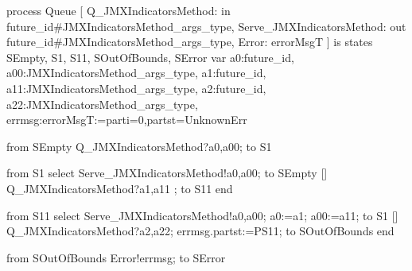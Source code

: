 process Queue [ Q_JMXIndicatorsMethod: in                            future_id#JMXIndicatorsMethod_args_type, 
 Serve_JMXIndicatorsMethod: out                              future_id#JMXIndicatorsMethod_args_type, 
 Error:  errorMsgT ]
is
  states SEmpty, S1, S11, SOutOfBounds, SError
  var a0:future_id, a00:JMXIndicatorsMethod_args_type, 
        a1:future_id, a11:JMXIndicatorsMethod_args_type, 
        a2:future_id, a22:JMXIndicatorsMethod_args_type, 
        errmsg:errorMsgT:={parti=0,partst=UnknownErr}

from SEmpty
    Q_JMXIndicatorsMethod?a0,a00; to S1
    
from S1 select 
     Serve_JMXIndicatorsMethod!a0,a00; to SEmpty
  [] Q_JMXIndicatorsMethod?a1,a11     ; to S11
end

from S11 select 
     Serve_JMXIndicatorsMethod!a0,a00; a0:=a1; a00:=a11;  to S1
  [] Q_JMXIndicatorsMethod?a2,a22; errmsg.partst:=PS11; to SOutOfBounds 
end

from SOutOfBounds
    Error!errmsg; to SError